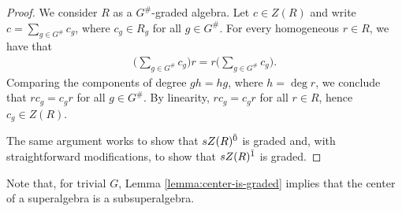 \begin{proof}
	We consider $R$ as a $G^\#$-graded algebra.
	Let $c \in Z(R)$ and write $c = \sum_{g \in G^\#} c_g$, where $c_g \in R_g$ for all $g \in G^\#$.
	For every homogeneous $r \in R$, we have that
	\begin{align*}
		\big(\sum_{g\in G^\#} c_g\big)r = r \big(\sum_{g\in G^\#} c_g\big).
	\end{align*}
	Comparing the components of degree $gh = hg$, where $h = \deg r$, we conclude that $rc_g = c_g r$ for all $g \in G^\#$.
	By linearity, $r c_g = c_g r$ for all $r\in R$, hence $c_g \in Z(R)$.

	The same argument works to show that $sZ(R)^{\bar0}$ is graded and, with straightforward modifications, to show that $sZ(R)^{\bar1}$ is graded.
\end{proof}

Note that, for trivial $G$, Lemma \ref{lemma:center-is-graded} implies that the center of a superalgebra is a subsuperalgebra. 










